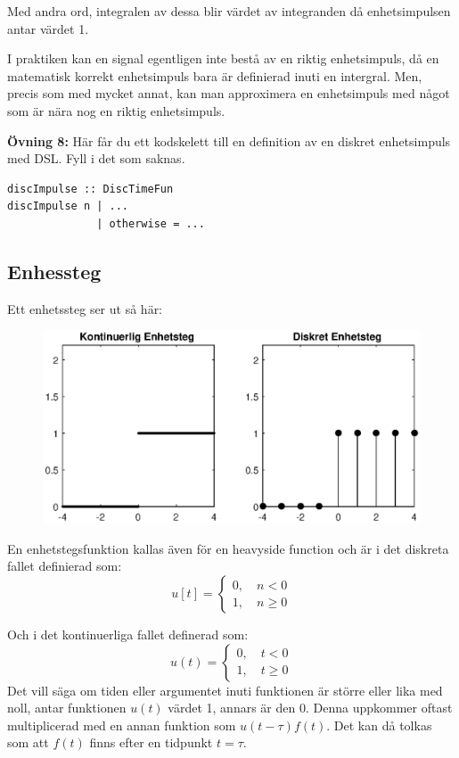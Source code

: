 \documentclass{article}
\begin{document}
Med andra ord, integralen av dessa blir värdet av integranden då enhetsimpulsen antar värdet 1.

I praktiken kan en signal egentligen inte bestå av en riktig enhetsimpuls, då en matematisk korrekt enhetsimpuls bara är definierad inuti en intergral. Men, precis som med mycket annat, kan man approximera en enhetsimpuls med något som är nära nog en riktig enhetsimpuls.

\textbf{Övning 8:} Här får du ett kodskelett till en definition av en diskret enhetsimpuls med DSL. Fyll i det som saknas.\\
\begin{verbatim}
discImpulse :: DiscTimeFun
discImpulse n | ...
              | otherwise = ...
\end{verbatim}

\subsection{Enhessteg}
Ett enhetssteg ser ut så här:

\begin{figure}[h]
\centerline{\includegraphics[scale=0.50]{heavy.eps}}
\caption{}
\label{}
\end{figure}

En enhetstegsfunktion kallas även för en heavyside function och är i det diskreta fallet definierad som:
$$
u[t] =
\begin{cases}
0, \quad n < 0 \\
1, \quad n \geq 0
\end{cases}
$$

Och i det kontinuerliga fallet definerad som:
$$
u(t) =
\begin{cases}
0, \quad t < 0 \\
1, \quad t \geq 0
\end{cases}
$$
Det vill säga om tiden eller argumentet inuti funktionen är större eller lika med noll, antar funktionen $u(t)$ värdet 1, annars är den 0. Denna uppkommer oftast multiplicerad med en annan funktion som $u(t-\tau) f(t)$. Det kan då tolkas som att $f(t)$ finns efter en tidpunkt $t = \tau$.
\end{document}
